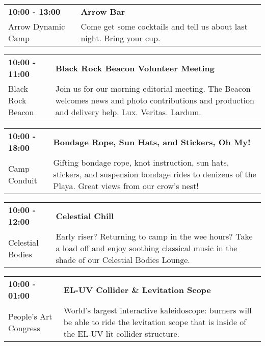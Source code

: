 \begin{tabular}{ p{1in} p{2.2in} }
    \textbf{10:00 - 13:00} & \textbf{Arrow Bar} \\
    Arrow Dynamic Camp \newline  & Come get some cocktails and tell us about last night. Bring your cup. \\
    \hline 
\end{tabular}
    
\begin{tabular}{ p{1in} p{2.2in} }
    \textbf{10:00 - 11:00} & \textbf{Black Rock Beacon Volunteer Meeting} \\
    Black Rock Beacon \newline  & Join us for our morning editorial meeting. The Beacon welcomes news and photo contributions and production and delivery help. Lux. Veritas. Lardum. \\
    \hline 
\end{tabular}
    
\begin{tabular}{ p{1in} p{2.2in} }
    \textbf{10:00 - 18:00} & \textbf{Bondage Rope, Sun Hats, and Stickers, Oh My!} \\
    Camp Conduit \newline  & Gifting bondage rope, knot instruction, sun hats, stickers, and suspension bondage rides to denizens of the Playa. Great views from our crow's nest! \\
    \hline 
\end{tabular}
    
\begin{tabular}{ p{1in} p{2.2in} }
    \textbf{10:00 - 12:00} & \textbf{Celestial Chill} \\
    Celestial Bodies \newline  & Early riser? Returning to camp in the wee hours? Take a load off and enjoy soothing classical music in the shade of our Celestial Bodies Lounge. \\
    \hline 
\end{tabular}
    
\begin{tabular}{ p{1in} p{2.2in} }
    \textbf{10:00 - 01:00} & \textbf{EL-UV Collider \& Levitation Scope} \\
    People's Art Congress \newline  & World's largest interactive kaleidoscope: burners will be able to ride the levitation scope that is inside of the EL-UV lit collider structure. \\
    \hline 
\end{tabular}
    
